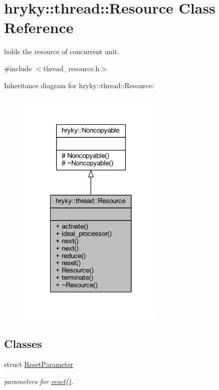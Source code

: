 \hypertarget{classhryky_1_1thread_1_1_resource}{\section{hryky\-:\-:thread\-:\-:Resource Class Reference}
\label{classhryky_1_1thread_1_1_resource}
}


holds the resource of concurrent unit.  




{\ttfamily \#include $<$thread\-\_\-resource.\-h$>$}



Inheritance diagram for hryky\-:\-:thread\-:\-:Resource\-:
\nopagebreak
\begin{figure}[H]
\begin{center}
\leavevmode
\includegraphics[width=200pt]{classhryky_1_1thread_1_1_resource__inherit__graph}
\end{center}
\end{figure}
\subsection*{Classes}
\begin{DoxyCompactItemize}
\item 
struct \hyperlink{structhryky_1_1thread_1_1_resource_1_1_reset_parameter}{Reset\-Parameter}
\begin{DoxyCompactList}\small\item\em parameters for \hyperlink{classhryky_1_1thread_1_1_resource_a1456f170e50e126104346013f1436b51}{reset()}. \end{DoxyCompactList}\end{DoxyCompactItemize}
